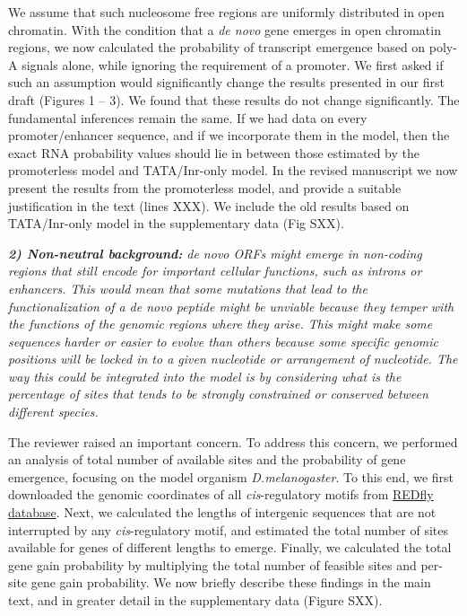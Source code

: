 \documentclass[12pt,a4paper]{article}
\begin{document}
We assume that such nucleosome free regions are uniformly distributed in open chromatin. With the condition that a \textit{de novo} gene emerges in open chromatin regions, we now calculated the probability of transcript emergence based on poly-A signals alone, while ignoring the requirement of a promoter. We first asked if such an assumption would significantly change the results presented in our first draft (Figures 1 -- 3). We found that these results do not change significantly. The fundamental inferences remain the same. If we had data on every promoter/enhancer sequence, and if we incorporate them in the model, then the exact RNA probability values should lie in between those estimated by the promoterless model and TATA/Inr-only model. In the revised manuscript we now present the results from the promoterless model, and provide a suitable justification in the text (lines XXX). We include the old results based on TATA/Inr-only model in the supplementary data (Fig SXX). 

{\itshape \textbf{2) Non-neutral background:} de novo ORFs might emerge in non-coding regions that still encode for important cellular functions, such as introns or enhancers. This would mean that some mutations that lead to the functionalization of a de novo peptide might be unviable because they temper with the functions of the genomic regions where they arise. This might make some sequences harder or easier to evolve than others because some specific genomic positions will be locked in to a given nucleotide or arrangement of nucleotide. The way this could be integrated into the model is by considering what is the percentage of sites that tends to be strongly constrained or conserved between different species.}

The reviewer raised an important concern. To address this concern, we performed an analysis of total number of available sites and the probability of gene emergence, focusing on the model organism \textit{D.melanogaster}. To this end, we first downloaded the genomic coordinates of all \textit{cis}-regulatory motifs from \href{http://redfly.ccr.buffalo.edu/}{REDfly database}. Next, we calculated the lengths of intergenic sequences that are not interrupted by any \textit{cis}-regulatory motif, and estimated the total number of sites available for genes of different lengths to emerge. Finally, we calculated the total gene gain probability by multiplying the total number of feasible sites and per-site gene gain probability. We now briefly describe these findings in the main text, and in greater detail in the supplementary data (Figure SXX).
\end{document}

